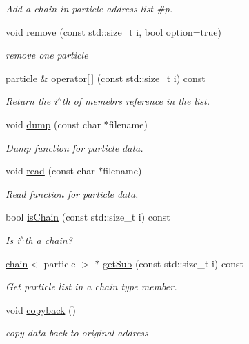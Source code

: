 \begin{DoxyCompactItemize}
\begin{DoxyCompactList}\small\item\em Add a chain in particle address list \#p. \end{DoxyCompactList}\item 
void \hyperlink{classARC_1_1chainlist_acfd8eb70053894bd0883a77d6c111932}{remove} (const std\+::size\+\_\+t i, bool option=true)
\begin{DoxyCompactList}\small\item\em remove one particle \end{DoxyCompactList}\item 
particle \& \hyperlink{classARC_1_1chainlist_a1d932a24ef6bbf98df3bc2a8b6162ddc}{operator\mbox{[}$\,$\mbox{]}} (const std\+::size\+\_\+t i) const
\begin{DoxyCompactList}\small\item\em Return the i$^\wedge$th of memebr\textquotesingle{}s reference in the list. \end{DoxyCompactList}\item 
void \hyperlink{classARC_1_1chainlist_a2dd5af449a9e85f487e1a2332b64060f}{dump} (const char $\ast$filename)
\begin{DoxyCompactList}\small\item\em Dump function for particle data. \end{DoxyCompactList}\item 
void \hyperlink{classARC_1_1chainlist_aea5f83e036a5e4649158f13cf341a31e}{read} (const char $\ast$filename)
\begin{DoxyCompactList}\small\item\em Read function for particle data. \end{DoxyCompactList}\item 
bool \hyperlink{classARC_1_1chainlist_a192f6db3659e5329d137de18c8c4b029}{is\+Chain} (const std\+::size\+\_\+t i) const
\begin{DoxyCompactList}\small\item\em Is i$^\wedge$th a chain? \end{DoxyCompactList}\item 
\hyperlink{classARC_1_1chain}{chain}$<$ particle $>$ $\ast$ \hyperlink{classARC_1_1chainlist_a14c6b75c2d3e97cf9babcac2aa014e8a}{get\+Sub} (const std\+::size\+\_\+t i) const
\begin{DoxyCompactList}\small\item\em Get particle list in a chain type member. \end{DoxyCompactList}\item 
void \hyperlink{classARC_1_1chainlist_a2249db484a34384214c4fbba8d4d19ad}{copyback} ()
\begin{DoxyCompactList}\small\item\em copy data back to original address \end{DoxyCompactList}\end{DoxyCompactItemize}


